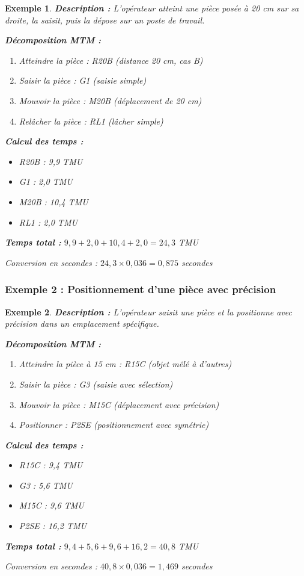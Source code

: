 \documentclass[a4paper,12pt]{article}
\newtheorem{exemple}{Exemple}[section]
\begin{document}
\begin{exemple}
\textbf{Description :} L'opérateur atteint une pièce posée à 20 cm sur sa droite, la saisit, puis la dépose sur un poste de travail.

\textbf{Décomposition MTM :}
\begin{enumerate}
    \item Atteindre la pièce : R20B (distance 20 cm, cas B)
    \item Saisir la pièce : G1 (saisie simple)
    \item Mouvoir la pièce : M20B (déplacement de 20 cm)
    \item Relâcher la pièce : RL1 (lâcher simple)
\end{enumerate}

\textbf{Calcul des temps :}
\begin{itemize}
    \item R20B : 9,9 TMU
    \item G1 : 2,0 TMU
    \item M20B : 10,4 TMU
    \item RL1 : 2,0 TMU
\end{itemize}

\textbf{Temps total :} $9,9 + 2,0 + 10,4 + 2,0 = 24,3$ TMU

Conversion en secondes : $24,3 \times 0,036 = 0,875$ secondes
\end{exemple}

\subsubsection{Exemple 2 : Positionnement d'une pièce avec précision}

\begin{exemple}
\textbf{Description :} L'opérateur saisit une pièce et la positionne avec précision dans un emplacement spécifique.

\textbf{Décomposition MTM :}
\begin{enumerate}
    \item Atteindre la pièce à 15 cm : R15C (objet mêlé à d'autres)
    \item Saisir la pièce : G3 (saisie avec sélection)
    \item Mouvoir la pièce : M15C (déplacement avec précision)
    \item Positionner : P2SE (positionnement avec symétrie)
\end{enumerate}

\textbf{Calcul des temps :}
\begin{itemize}
    \item R15C : 9,4 TMU
    \item G3 : 5,6 TMU
    \item M15C : 9,6 TMU
    \item P2SE : 16,2 TMU
\end{itemize}

\textbf{Temps total :} $9,4 + 5,6 + 9,6 + 16,2 = 40,8$ TMU

Conversion en secondes : $40,8 \times 0,036 = 1,469$ secondes
\end{exemple}
\end{document}
